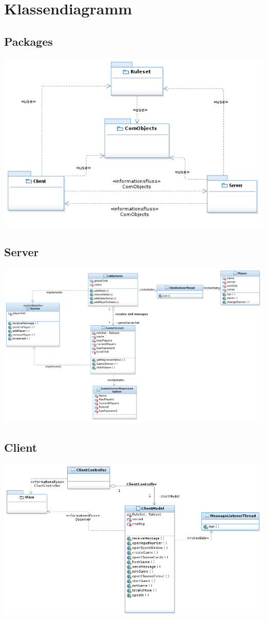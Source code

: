 \documentclass{article}
\begin{document}
\section{Klassendiagramm}
\subsection{Packages}
\includegraphics[width=\textwidth]{Packages}
\subsection{Server}
\includegraphics[width=\textwidth]{Server}
\subsection{Client}
\includegraphics[width=\textwidth]{Client}
\end{document}
